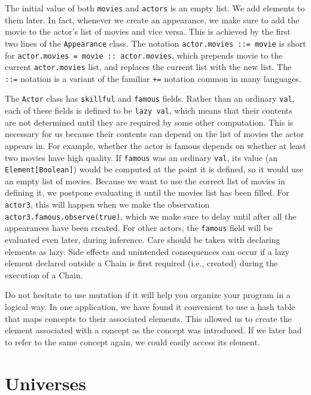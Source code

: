 The initial value of both \texttt{movies} and \texttt{actors} is an empty list. We add elements to them later. In fact, whenever we create an appearance, we make sure to add the movie to the actor's list of movies and vice versa. This is achieved by the first two lines of the \texttt{Appearance} class. The notation \texttt{actor.movies ::= movie} is short for \texttt{actor.movies = movie :: actor.movies}, which prepends movie to the current \texttt{actor.movies} list, and replaces the current list with the new list. The \texttt{::=} notation is a variant of the familiar \texttt{+=} notation common in many languages.

The \texttt{Actor} class has \texttt{skillful} and \texttt{famous} fields. Rather than an ordinary \texttt{val}, each of these fields is defined to be \texttt{lazy val}, which means that their contents are not determined until they are required by some other computation. This is necessary for us because their contents can depend on the list of movies the actor appears in. For example, whether the actor is famous depends on whether at least two movies have high quality. If \texttt{famous} was an ordinary \texttt{val}, its value (an \texttt{Element[Boolean]}) would be computed at the point it is defined, so it would use an empty list of movies. Because we want to use the correct list of movies in defining it, we postpone evaluating it until the movies list has been filled. For \texttt{actor3}, this will happen when we make the observation \texttt{actor3.famous.observe(true)}, which we make sure to delay until after all the appearances have been created. For other actors, the \texttt{famous} field will be evaluated even later, during inference. Care should be taken with declaring elements as lazy. Side effects and unintended consequences can occur if a lazy element declared outside a Chain is first required (i.e., created) during the execution of a Chain.

Do not hesitate to use mutation if it will help you organize your program in a logical way. In one application, we have found it convenient to use a hash table that maps concepts to their associated elements. This allowed us to create the element associated with a concept as the concept was introduced. If we later had to refer to the same concept again, we could easily access its element.

\section{Universes}

